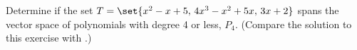 Determine if the set $T=\set{x^2-x+5,\,4x^3-x^2+5x,\,3x+2}$ spans the vector space of polynomials with degree 4 or less, $P_4$.  (Compare the solution to this exercise with .)
